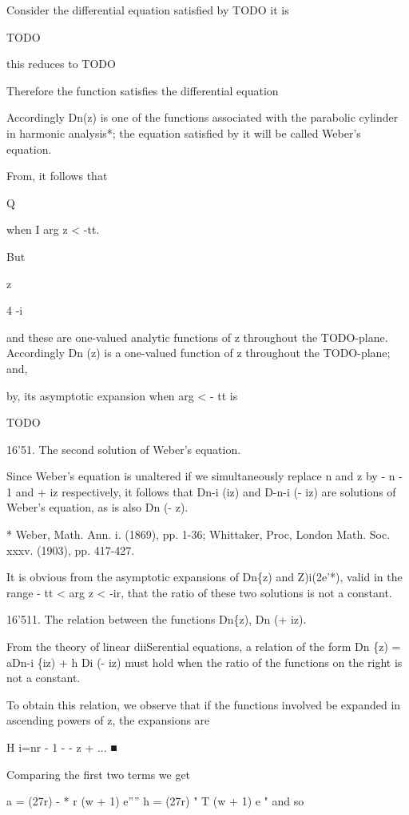 Consider the differential equation satisfied by TODO it is

TODO

this reduces to TODO

Therefore the function satisfies the differential equation

Accordingly Dn(z) is one of the functions associated with the
parabolic cylinder in harmonic analysis*; the equation satisfied by it
will be called Weber's equation.

From, it follows that

Q

when I arg z < -tt.

But

z

4 -i

and these are one-valued analytic functions of z throughout the
TODO-plane. Accordingly Dn (z) is a one-valued function of z
throughout the TODO-plane; and,

by, its asymptotic expansion when arg  < - tt is

TODO

16'51. The second solution of Weber's equation.

Since Weber's equation is unaltered if we simultaneously replace n and
z by - n - 1 and + iz respectively, it follows that Dn-i (iz) and
D-n-i (- iz) are solutions of Weber's equation, as is also Dn (- z).

* Weber, Math. Ann. i. (1869), pp. 1-36; Whittaker, Proc, London Math.
Soc. xxxv. (1903), pp. 417-427.

%
%

It is obvious from the asymptotic expansions of Dn\{z) and
Z)i(2e'*), valid in the range -  tt < arg z < -ir, that the
ratio of these two solutions is not a constant.

16'511. The relation between the functions Dn\{z), Dn (+ iz).

From the theory of linear diiSerential equations, a relation of the
form Dn \{z) = aDn-i \{iz) + h Di (- iz) must hold when the
ratio of the functions on the right is not a constant.

To obtain this relation, we observe that if the functions involved be
expanded in ascending powers of z, the expansions are

H i=nr - 1 -  - z + ... ■

Comparing the first two terms we get

a = (27r) - * r (w + 1) e'''' h = (27r) "  T (w + 1) e " and so

